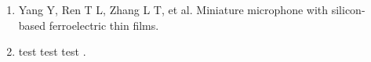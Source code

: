 \begin{paper}
\begin{enumerate}
  \item Yang Y, Ren T L, Zhang L T, et al. Miniature microphone with silicon-
    based ferroelectric thin films. 
  \item test test test . 
\end{enumerate}

\end{paper}

